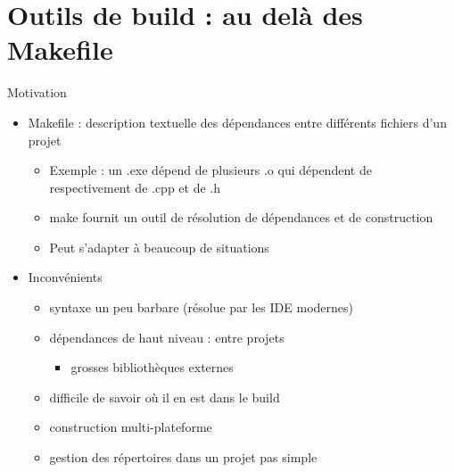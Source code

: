 \section{Outils de build : au delà des
Makefile}\label{outils-de-build-au-deluxe0-des-makefile}

\begin{frame}{Motivation}

\begin{itemize}
\itemsep1pt\parskip0pt
\item
  Makefile : description textuelle des dépendances entre différents
  fichiers d'un projet

  \begin{itemize}
  \itemsep1pt\parskip0pt
  \item
    Exemple : un .exe dépend de plusieurs .o qui dépendent de
    respectivement de .cpp et de .h
  \item
    make fournit un outil de résolution de dépendances et de
    construction
  \item
    Peut s'adapter à beaucoup de situations
  \end{itemize}
\item
  Inconvénients

  \begin{itemize}
  \itemsep1pt\parskip0pt
  \item
    syntaxe un peu barbare (résolue par les IDE modernes)
  \item
    dépendances de haut niveau : entre projets

    \begin{itemize}
    \itemsep1pt\parskip0pt
    \item
      grosses bibliothèques externes
    \end{itemize}
  \item
    difficile de savoir où il en est dans le build
  \item
    construction multi-plateforme
    \item gestion des répertoires dans un projet pas simple
  \end{itemize}
\end{itemize}

\end{frame}

